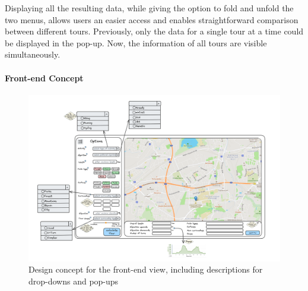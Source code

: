 Displaying all the resulting data, while giving the option to fold and unfold the two menus, allows users an easier access and enables straightforward comparison between different tours.
Previously, only the data for a single tour at a time could be displayed in the pop-up.
Now, the information of all tours are visible simultaneously. 

\paragraph{Front-end Concept}

\begin{figure}
	\centering
	\includegraphics[width=0.9\linewidth]{bilder/Concept new Frontend design.png}
	\caption{Design concept for the front-end view, including descriptions for drop-downs and pop-ups}
	\label{fig:frontendConcept}
\end{figure}



